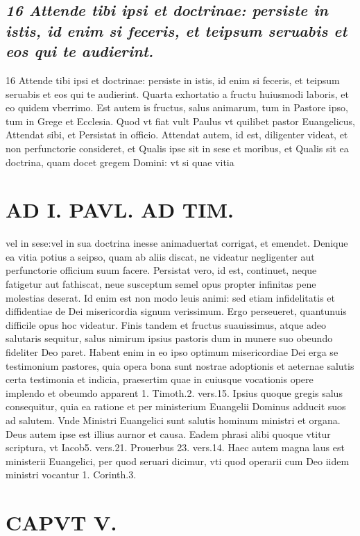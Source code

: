 \documentclass{article}
\begin{document}
\begin{pages}
\subsection*{\textit{16 Attende tibi ipsi et doctrinae: persiste in istis, id enim si feceris, et teipsum seruabis et eos qui te audierint.}}16 Attende tibi ipsi et doctrinae: persiste in istis, id enim si feceris, et teipsum seruabis et eos qui te audierint. Quarta exhortatio a fructu huiusmodi laboris, et eo quidem vberrimo. Est autem is fructus, salus animarum, tum in Pastore ipso, tum in Grege et Ecclesia. Quod vt fiat vult Paulus vt quilibet pastor Euangelicus, Attendat sibi, et Persistat in officio. Attendat autem, id est, diligenter videat, et non perfunctorie consideret, et Qualis ipse sit in sese et moribus, et Qualis sit ea doctrina, quam docet gregem Domini: vt si quae vitia  \pend
\section*{AD I. PAVL. AD TIM. }
\marginpar{[ p.238 ]}\pstart vel in sese:vel in sua doctrina inesse animaduertat corrigat, et emendet. Denique ea vitia potius a seipso, quam ab aliis discat, ne videatur negligenter aut perfunctorie officium suum facere. Persistat vero, id est, continuet, neque fatigetur aut fathiscat, neue susceptum semel opus propter infinitas pene molestias deserat. Id enim est non modo leuis animi: sed etiam infidelitatis et diffidentiae de Dei misericordia signum verissimum. Ergo perseueret, quantunuis difficile opus hoc videatur. Finis tandem et fructus suauissimus, atque adeo salutaris sequitur, salus nimirum ipsius pastoris dum in munere suo obeundo fideliter Deo paret. Habent enim in eo ipso optimum misericordiae Dei erga se testimonium pastores, quia opera bona sunt nostrae adoptionis et aeternae salutis certa testimonia et indicia, praesertim quae in cuiusque vocationis opere implendo et obeumdo apparent 1. Timoth.2. vers.15. Ipsius quoque gregis salus consequitur, quia ea ratione et per ministerium Euangelii Dominus adducit suos ad salutem. Vnde Ministri Euangelici sunt salutis hominum ministri et organa. Deus autem ipse est illius aurnor et causa. Eadem phrasi alibi quoque vtitur scriptura, vt Iacob5. vers.21. Prouerbus 23. vers.14. Haec autem magna laus est ministerii Euangelici, per quod seruari dicimur, vti quod operarii cum Deo iidem ministri vocantur 1. Corinth.3.  \pend
\endnumbering
\section{CAPVT  V. }
\beginnumbering
\marginpar{[ p.239 ]}\pstart {}
{}

\end{pages}
\end{document}
